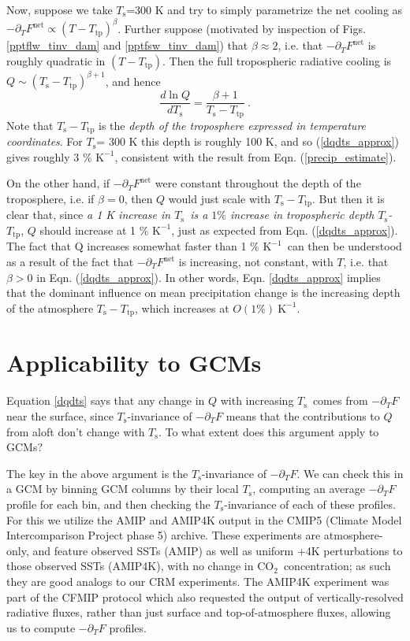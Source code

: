 \documentclass[9pt,twocolumn,twoside,lineno]{pnas-new}
\newcommand{\beqn}{\begin{equation}}
\newcommand{\eeqn}{\end{equation}}
\newcommand{\eqnref}[1]{(\ref{#1})}
\newcommand{\ppt}{\ensuremath{\partial_T}}
\newcommand{\cotwo}{\ensuremath{\mathrm{CO_2}}}
\newcommand{\Fnet}{\ensuremath{F^\mathrm{net}}}
\newcommand{\Kinverse}{\ensuremath{\mathrm{K^{-1}}}}
\newcommand{\Ts}{\ensuremath{T_\mathrm{s}}}
\newcommand{\Ttp}{\ensuremath{T_\mathrm{tp}}}
\begin{document}
Now, suppose we take \Ts=300 K and  try to simply parametrize the net cooling as $-\ppt \Fnet \propto (T-\Ttp)^\beta$.  Further suppose (motivated by inspection of Figs. \ref{pptflw_tinv_dam} and \ref{pptfsw_tinv_dam})  that $\beta \approx 2$, i.e. that $-\ppt \Fnet$ is roughly quadratic  in $(T-\Ttp)$. Then the full tropospheric radiative cooling is $Q\sim (\Ts-\Ttp)^{\beta+1}$, and hence 
	\beqn
		\frac{d \ln Q}{d \Ts}  =  \frac{\beta+1}{\Ts-\Ttp}\ . \label{dqdts_approx}
	\eeqn
Note that $\Ts-\Ttp$ is the \emph{depth of the troposphere expressed in temperature coordinates}. For  \Ts= 300 K this depth is roughly 100 K, and so \eqnref{dqdts_approx} gives roughly 3 \% \Kinverse, consistent with the result from Eqn. \eqnref{precip_estimate}.

On the other hand, if $-\ppt \Fnet$ were constant throughout the depth of the troposphere, i.e. if $\beta=0$, then $Q$ would just scale with $\Ts-\Ttp$. But then it is clear that, since \emph{a 1 K increase in \Ts\  is a $1\%$ increase in tropospheric depth \Ts-\Ttp}, $Q$ should increase at 1 \% \Kinverse, just as expected from Eqn. \eqnref{dqdts_approx}. The fact that Q increases somewhat faster than 1 \% \Kinverse\  can then be understood as a result of the fact that $-\ppt \Fnet$ is increasing, not constant, with $T$, i.e. that $\beta>0$ in Eqn. \eqnref{dqdts_approx}. In other words, Eqn. \ref{dqdts_approx} implies that the dominant influence on mean precipitation change is the increasing depth of the atmosphere $\Ts-\Ttp$, which increases at $O(1\%)\ \Kinverse$.



\section{Applicability to GCMs} \label{sec_GCMs}
Equation \ref{dqdts} says that any change in $Q$ with increasing \Ts\ comes from $-\ppt F$ near the surface, since  \Ts-invariance of $-\ppt F$ means that the contributions to $Q$ from aloft don't change with \Ts. To what extent does this argument apply to GCMs?

The key in the above argument is the \Ts-invariance of $-\ppt F$. We can check this in a GCM by binning  GCM columns by their local \Ts, computing an average $-\ppt F$ profile for each bin, and then checking the \Ts-invariance of each of these profiles. For this we utilize the AMIP and AMIP4K  output in the CMIP5 (Climate Model Intercomparison Project phase 5) archive. These experiments are atmosphere-only, and feature observed SSTs (AMIP) as well as uniform +4K perturbations to those observed SSTs (AMIP4K), with no change in \cotwo\ concentration; as such they are good analogs to our CRM experiments. The AMIP4K experiment was part of the CFMIP protocol \cite[Cloud Feedback Model Intercomparison Project,][]{bony2011} which also requested the output of vertically-resolved radiative fluxes, rather than just surface and top-of-atmosphere fluxes, allowing us to compute $-\ppt F$ profiles.
\end{document}
